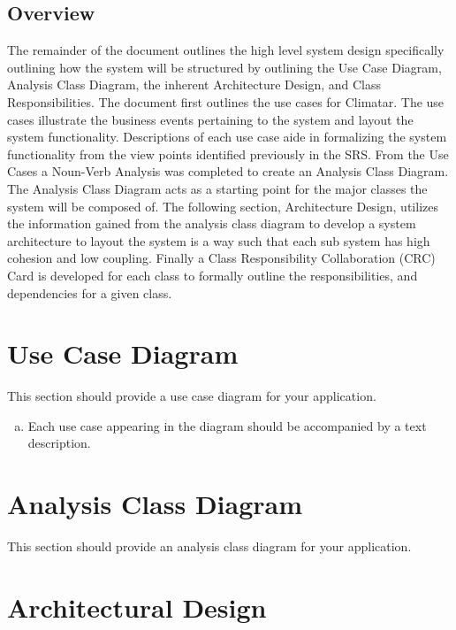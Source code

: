 \documentclass[]{article}
\begin{document}
\subsection{Overview}
\label{sub:overview}
The remainder of the document outlines the high level system design specifically outlining how the system will be structured by outlining the Use Case Diagram, Analysis Class Diagram, the inherent Architecture Design, and Class Responsibilities. The document first outlines the use cases for Climatar. The use cases illustrate the business events pertaining to the system and layout the system functionality. Descriptions of each use case aide in formalizing the system functionality from the view points identified previously in the SRS. From the Use Cases a Noun-Verb Analysis was completed to create an Analysis Class Diagram. The Analysis Class Diagram acts as a starting point for the major classes the system will be composed of. The following section, Architecture Design, utilizes the information gained from the analysis class diagram to develop a system architecture to layout the system is a way such that each sub system has high cohesion and low coupling. Finally a Class Responsibility Collaboration (CRC) Card is developed for each class to formally outline the responsibilities, and dependencies for a given class.


\section{Use Case Diagram}
\label{sec:use_case_diagram}

This section should provide a use case diagram for your application. 
\begin{enumerate}[a)]
	\item Each use case appearing in the diagram should be accompanied by a text description. 
\end{enumerate}

\section{Analysis Class Diagram}
\label{sec:analysis_class_diagram}
This section should provide an analysis class diagram for your application.


\section{Architectural Design}
\label{sec:architectural_design}
\end{document}

